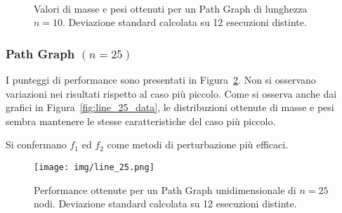 \documentclass[10pt,a4paper]{article}
\begin{document}
\begin{figure}[p]
    \centering
    \\
    \caption{Valori di masse e pesi ottenuti per un Path Graph di lunghezza \(n=10\). Deviazione standard calcolata su 12 esecuzioni distinte.}\label{fig:line_10_data}
\end{figure}

\subsubsection{Path Graph \((n = 25)\)}

I punteggi di performance sono presentati in Figura~\ref{fig:line_25_performance}.
Non si osservano variazioni nei risultati rispetto al caso più piccolo.
Come si osserva anche dai grafici in Figura~\ref{fig:line_25_data}, le distribuzioni ottenute di masse e pesi sembra mantenere le stesse caratteristiche del caso più piccolo.

Si confermano \(f_1\) ed \(f_2\) come metodi di perturbazione più efficaci.

\begin{figure}[p]
    \centering
    \texttt{[image: img/line\_25.png]}
    \caption{Performance ottenute per un Path Graph unidimensionale di \(n=25\) nodi. Deviazione standard calcolata su 12 esecuzioni distinte.}\label{fig:line_25_performance}
\end{figure}
\end{document}
